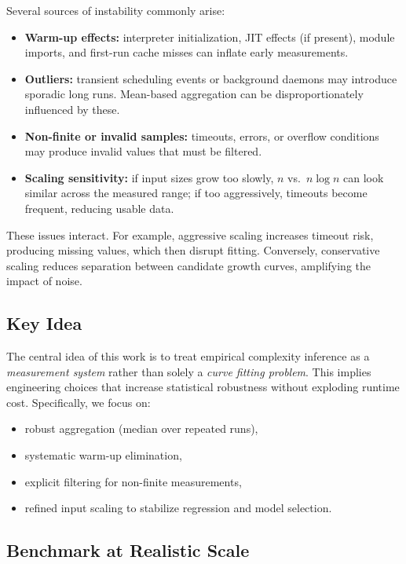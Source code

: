 \documentclass[conference]{IEEEtran}
\begin{document}
Several sources of instability commonly arise:
\begin{itemize}[leftmargin=1.2em]
\item \textbf{Warm-up effects:}
interpreter initialization, JIT effects (if present), module imports,
and first-run cache misses can inflate early measurements.
\item \textbf{Outliers:}
transient scheduling events or background daemons may introduce sporadic long
runs.
Mean-based aggregation can be disproportionately influenced by these.
\item \textbf{Non-finite or invalid samples:}
timeouts, errors, or overflow conditions may produce invalid values that must
be filtered.
\item \textbf{Scaling sensitivity:}
if input sizes grow too slowly, $n$ vs.\ $n \log n$ can look similar across the
measured range; if too aggressively, timeouts become frequent, reducing usable
data.
\end{itemize}

These issues interact.
For example, aggressive scaling increases timeout risk, producing missing
values, which then disrupt fitting.
Conversely, conservative scaling reduces separation between candidate growth
curves, amplifying the impact of noise.

\subsection{Key Idea}

The central idea of this work is to treat empirical complexity inference as a
\emph{measurement system} rather than solely a \emph{curve fitting problem}.
This implies engineering choices that increase statistical robustness without
exploding runtime cost.
Specifically, we focus on:
\begin{itemize}[leftmargin=1.2em]
\item robust aggregation (median over repeated runs),
\item systematic warm-up elimination,
\item explicit filtering for non-finite measurements,
\item refined input scaling to stabilize regression and model selection.
\end{itemize}

\subsection{Benchmark at Realistic Scale}
\end{document}
